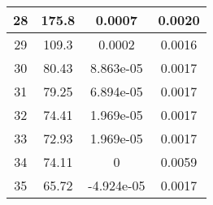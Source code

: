 \begin{table}[!h]
\begin{tabular}{|c||c|c|c|}
        28 & 175.8 & 0.0007 & 0.0020 \\\hline
        29 & 109.3 & 0.0002 & 0.0016 \\\hline
        30 & 80.43 & 8.863e-05 & 0.0017 \\\hline
        31 & 79.25 & 6.894e-05 & 0.0017 \\\hline
        32 & 74.41 & 1.969e-05 & 0.0017 \\\hline
        33 & 72.93 & 1.969e-05 & 0.0017 \\\hline
        34 & 74.11 & 0 & 0.0059 \\\hline
        35 & 65.72 & -4.924e-05 & 0.0017 \\\bottomrule
    \end{tabular}
    \label{tab:4}
\end{table}